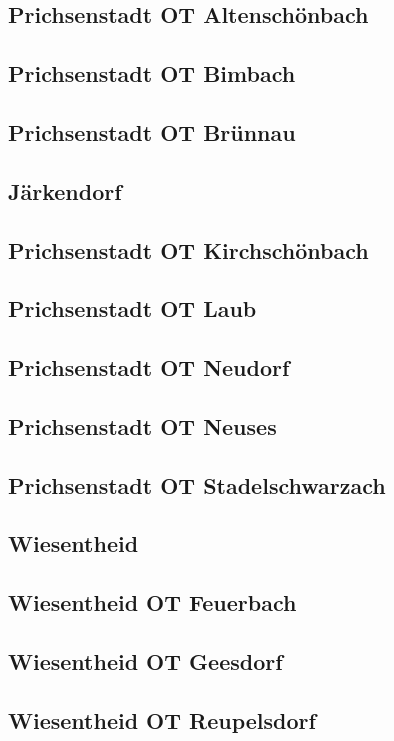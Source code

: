 \documentclass[fontsize=12pt,a4paper]{scrreprt}
\begin{document}
                \subsection{Prichsenstadt OT Altenschönbach}
                \subsection{Prichsenstadt OT Bimbach} 
                \subsection{Prichsenstadt OT Brünnau}
                \subsection{Järkendorf}
                \subsection{Prichsenstadt OT Kirchschönbach}
                \subsection{Prichsenstadt OT Laub}
                \subsection{Prichsenstadt OT Neudorf}
                \subsection{Prichsenstadt OT Neuses}
                \subsection{Prichsenstadt OT Stadelschwarzach}
                \subsection{Wiesentheid}
                \subsection{Wiesentheid OT Feuerbach}
                \subsection{Wiesentheid OT Geesdorf}
                \subsection{Wiesentheid OT Reupelsdorf}
\end{document}
